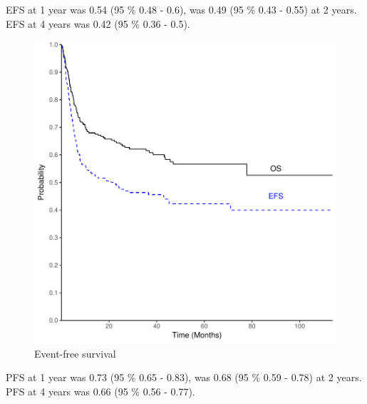 \documentclass[a4paper,11pt] {article}
\begin{document}
\pagebreak
EFS at 1 year was 0.54 (95 \% 0.48 - 0.6), was 0.49 (95 \% 0.43 - 0.55) at 2 years. EFS at 4 years was 0.42 (95 \% 0.36 - 0.5).

\begin{figure}[h]
\begin{center}
\includegraphics{Rapport-fig2}
\end{center}
\caption{Event-free survival}
\label{fig2}
\end{figure}

\pagebreak
PFS at 1 year was 0.73 (95 \% 0.65 - 0.83), was 0.68 (95 \% 0.59 - 0.78) at 2 years. PFS at 4 years was 0.66 (95 \% 0.56 - 0.77).
\end{document}
